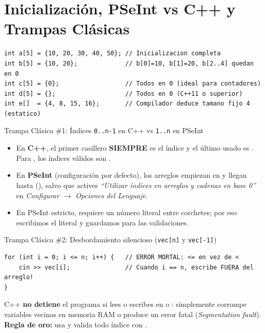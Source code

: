 \documentclass[11pt,letterpaper]{article}
\begin{document}
\section{Inicialización, PSeInt vs C++ y Trampas Clásicas}

\begin{lstlisting}[style=cppmonitoria]
int a[5] = {10, 20, 30, 40, 50}; // Inicializacion completa
int b[5] = {10, 20};             // b[0]=10, b[1]=20, b[2..4] quedan en 0
int c[5] = {0};                  // Todos en 0 (ideal para contadores)
int d[5] = {};                   // Todos en 0 (C++11 o superior)
int e[]  = {4, 8, 15, 16};       // Compilador deduce tamano fijo 4 (estatico)
\end{lstlisting}

\begin{peligro}{Trampa Clásica \#1: Índices \texttt{0..n-1} en C++ vs \texttt{1..n} en PSeInt}
\begin{itemize}
  \item En \textbf{C++}, el primer casillero \textbf{SIEMPRE} es el índice  y el último usado es . Para , los índices válidos son .
  \item En \textbf{PSeInt} (configuración por defecto), los arreglos empiezan en  y llegan hasta  (), salvo que actives \emph{``Utilizar índices en arreglos y cadenas en base 0''} en \emph{Configurar $\rightarrow$ Opciones del Lenguaje}.
  \item En PSeInt estricto,  requiere un número literal entre corchetes; por eso escribimos el literal y guardamos  para las validaciones.
\end{itemize}
\end{peligro}

\begin{peligro}{Trampa Clásica \#2: Desbordamiento silencioso (\texttt{vec[n]} y \texttt{vec[-1]})}
\begin{lstlisting}[style=cppmonitoria]
for (int i = 0; i <= n; i++) {   // ERROR MORTAL: <= en vez de <
    cin >> vec[i];               // Cuando i == n, escribe FUERA del arreglo!
}
\end{lstlisting}
C++ \textbf{no detiene} el programa si lees o escribes en  o : simplemente corrompe variables vecinas en memoria RAM o produce un error fatal (\emph{Segmentation fault}). \textbf{Regla de oro:} usa  y valida todo índice  con .
\end{peligro}
\end{document}
